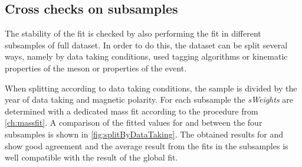 \subsection{Cross checks on subsamples}
\label{sec:valOnSubSample}

The stability of the fit is checked by also performing the fit in different subsamples of full dataset.
In order to do this, the dataset can be split several ways, namely by data taking conditions, used tagging algorithms or kinematic properties of the \Bz meson or properties of the event.

When splitting according to data taking conditions, the \BdToDpi sample is divided by the year of data taking and magnetic polarity.
For each subsample the \emph{sWeights} are determined with a dedicated mass fit according to the procedure from \cref{ch:massfit}.
A comparison of the fitted values for \Sf and \Sfbar between the four subsamples is shown in \cref{fig:splitByDataTaking}.
The obtained results for \Sf and \Sfbar show good agreement and the average result from the fits in the subsamples is well compatible with the result of the global fit.
